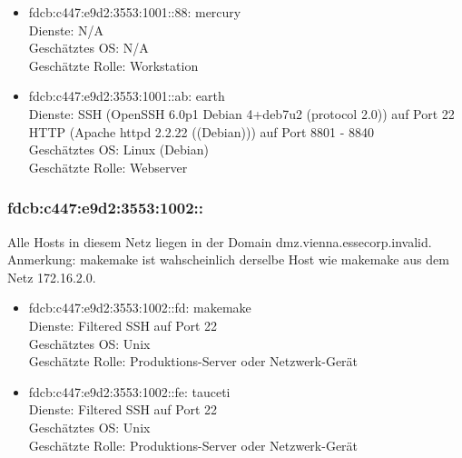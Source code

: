 \documentclass[12pt,a4paper,titlepage,oneside]{scrartcl}
\begin{document}
\begin{itemize}
	\item fdcb:c447:e9d2:3553:1001::88: mercury
	\\Dienste: N/A
	\\Geschätztes OS: N/A
	\\Geschätzte Rolle: Workstation
		
	\item fdcb:c447:e9d2:3553:1001::ab: earth
	\\Dienste: SSH (OpenSSH 6.0p1 Debian 4+deb7u2 (protocol 2.0)) auf Port 22
	\\HTTP (Apache httpd 2.2.22 ((Debian))) auf Port 8801 - 8840
	\\Geschätztes OS: Linux (Debian)
	\\Geschätzte Rolle: Webserver
\end{itemize}

\subsubsection{fdcb:c447:e9d2:3553:1002::}
Alle Hosts in diesem Netz liegen in der Domain dmz.vienna.essecorp.invalid.
Anmerkung: makemake ist wahscheinlich derselbe Host wie makemake aus dem Netz 172.16.2.0.
\begin{itemize}
	\item fdcb:c447:e9d2:3553:1002::fd: makemake
	\\Dienste: Filtered SSH auf Port 22
	\\Geschätztes OS: Unix
	\\Geschätzte Rolle: Produktions-Server oder Netzwerk-Gerät
	
	\item fdcb:c447:e9d2:3553:1002::fe: tauceti
	\\Dienste: Filtered SSH auf Port 22
	\\Geschätztes OS: Unix
	\\Geschätzte Rolle: Produktions-Server oder Netzwerk-Gerät
\end{itemize}
\end{document}
